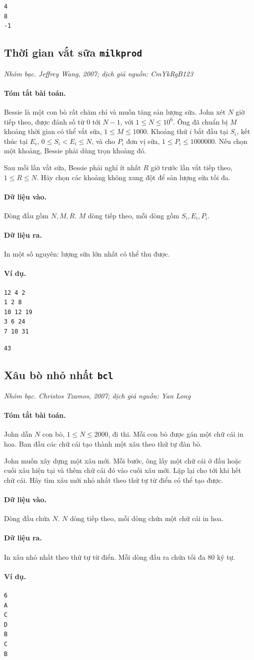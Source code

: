 \documentclass[11pt]{article}
\newcommand{\problem}[4]{%
  \subsection[#1 (#2)]{#1 \hfill {\normalsize\texttt{#2}}}%
  \noindent\textit{#3. #4}\par\smallskip
}
\newcommand{\iosec}[1]{\paragraph{#1}}
\begin{document}
\begin{verbatim}
4
8
-1
\end{verbatim}

\problem{Thời gian vắt sữa}{milkprod}{Nhóm bạc}{Jeffrey Wang, 2007; dịch giả nguồn: CmYkRgB123}

\iosec{Tóm tắt bài toán.}
Bessie là một con bò rất chăm chỉ và muốn tăng sản lượng sữa. John xét
\(N\) giờ tiếp theo, được đánh số từ \(0\) tới \(N-1\), với
\(1\le N\le 10^6\). Ông đã chuẩn bị \(M\) khoảng thời gian có thể vắt sữa,
\(1\le M\le 1000\). Khoảng thứ \(i\) bắt đầu tại \(S_i\), kết thúc tại
\(E_i\), \(0\le S_i<E_i\le N\), và cho \(P_i\) đơn vị sữa,
\(1\le P_i\le 1000000\). Nếu chọn một khoảng, Bessie phải dùng trọn khoảng
đó.

Sau mỗi lần vắt sữa, Bessie phải nghỉ ít nhất \(R\) giờ trước lần vắt tiếp
theo, \(1\le R\le N\). Hãy chọn các khoảng không xung đột để sản lượng sữa
tối đa.

\iosec{Dữ liệu vào.}
Dòng đầu gồm \(N,M,R\). \(M\) dòng tiếp theo, mỗi dòng gồm \(S_i,E_i,P_i\).

\iosec{Dữ liệu ra.}
In một số nguyên: lượng sữa lớn nhất có thể thu được.

\iosec{Ví dụ.}
\begin{verbatim}
12 4 2
1 2 8
10 12 19
3 6 24
7 10 31
\end{verbatim}

\begin{verbatim}
43
\end{verbatim}

\problem{Xâu bò nhỏ nhất}{bcl}{Nhóm bạc}{Christos Tzamos, 2007; dịch giả nguồn: Yan Long}

\iosec{Tóm tắt bài toán.}
John dẫn \(N\) con bò, \(1\le N\le 2000\), đi thi. Mỗi con bò được gán một
chữ cái in hoa. Ban đầu các chữ cái tạo thành một xâu theo thứ tự đàn bò.

John muốn xây dựng một xâu mới. Mỗi bước, ông lấy một chữ cái ở đầu hoặc cuối
xâu hiện tại và thêm chữ cái đó vào cuối xâu mới. Lặp lại cho tới khi hết chữ
cái. Hãy tìm xâu mới nhỏ nhất theo thứ tự từ điển có thể tạo được.

\iosec{Dữ liệu vào.}
Dòng đầu chứa \(N\). \(N\) dòng tiếp theo, mỗi dòng chứa một chữ cái in hoa.

\iosec{Dữ liệu ra.}
In xâu nhỏ nhất theo thứ tự từ điển. Mỗi dòng đầu ra chứa tối đa \(80\) ký tự.

\iosec{Ví dụ.}
\begin{verbatim}
6
A
C
D
B
C
B
\end{verbatim}
\end{document}
